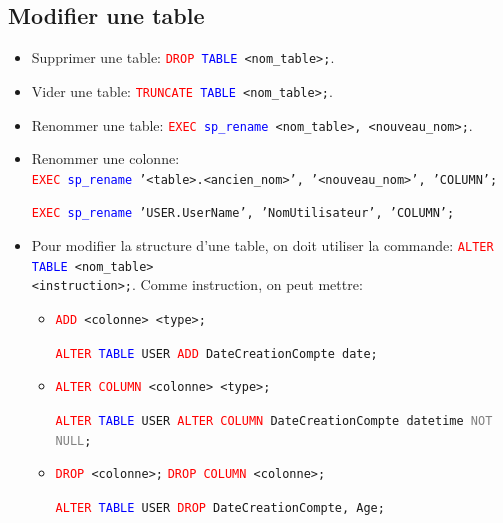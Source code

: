 \documentclass[a4paper]{article}
\begin{document}
\subsection{Modifier une table}





\begin{itemize}



\item Supprimer une table: \texttt{\textcolor{red}{DROP} \textcolor{blue}{TABLE} <nom\_table>;}.



\item Vider une table: \texttt{\textcolor{red}{TRUNCATE} \textcolor{blue}{TABLE} <nom\_table>;}.



\item Renommer une table: \texttt{\textcolor{red}{EXEC} \textcolor{blue}{sp\_rename} <nom\_table>, <nouveau\_nom>;}.



\item Renommer une colonne:\\
\texttt{\textcolor{red}{EXEC} \textcolor{blue}{sp\_rename} '<table>.<ancien\_nom>', '<nouveau\_nom>', 'COLUMN';}
\begin{example}
    \texttt{\textcolor{red}{EXEC} \textcolor{blue}{sp\_rename} 'USER.UserName', 'NomUtilisateur', 'COLUMN';}
\end{example}



\item Pour modifier la structure d'une table, on doit utiliser la commande: \texttt{\textcolor{red}{ALTER} \textcolor{blue}{TABLE} <nom\_table>\\ <instruction>;}. Comme instruction, on peut mettre:
\begin{itemize}
    \item \texttt{\textcolor{red}{ADD} <colonne> <type>;}
    \begin{example}
        \texttt{\textcolor{red}{ALTER} \textcolor{blue}{TABLE} USER \textcolor{red}{ADD} DateCreationCompte date;}
    \end{example}
    \item \texttt{\textcolor{red}{ALTER COLUMN} <colonne> <type>;}
    \begin{example}
        \texttt{\textcolor{red}{ALTER} \textcolor{blue}{TABLE} USER \textcolor{red}{ALTER COLUMN} DateCreationCompte datetime \textcolor{gray}{NOT NULL};}
    \end{example}
    \item \texttt{\textcolor{red}{DROP} <colonne>;} \texttt{\textcolor{red}{DROP COLUMN} <colonne>;}
    \begin{example}
        \texttt{\textcolor{red}{ALTER} \textcolor{blue}{TABLE} USER \textcolor{red}{DROP} DateCreationCompte, Age;}
    \end{example}
\end{itemize}



\end{itemize}
\end{document}
